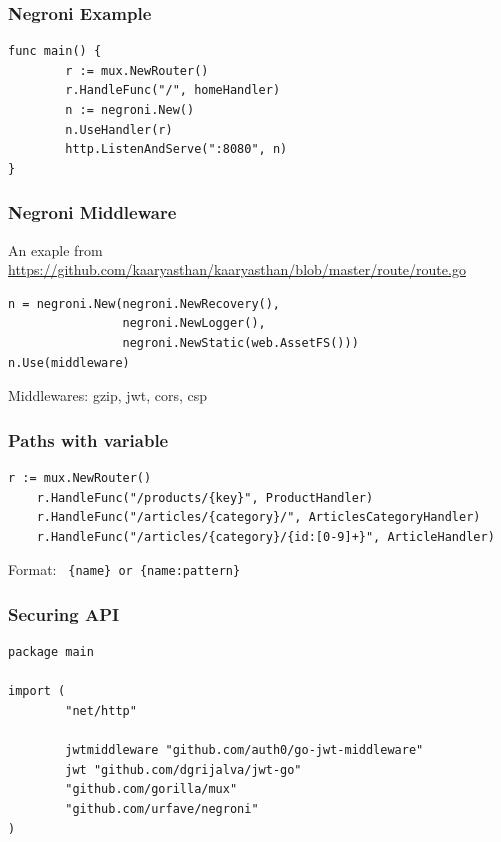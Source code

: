 \documentclass[aspectratio=169]{beamer}
\begin{document}
\begin{frame}[fragile]
  \frametitle{Negroni Example}

\begin{Verbatim}[fontsize=\small]
func main() {
        r := mux.NewRouter()
        r.HandleFunc("/", homeHandler)
        n := negroni.New()
        n.UseHandler(r)
        http.ListenAndServe(":8080", n)
}
\end{Verbatim}
\end{frame}

\begin{frame}[fragile]
  \frametitle{Negroni Middleware}

  An exaple from \small{\url{https://github.com/kaaryasthan/kaaryasthan/blob/master/route/route.go}}
  
\begin{Verbatim}[fontsize=\small]
n = negroni.New(negroni.NewRecovery(),
                negroni.NewLogger(),
                negroni.NewStatic(web.AssetFS()))
n.Use(middleware)
\end{Verbatim}
Middlewares: gzip, jwt, cors, csp
\end{frame}


\begin{frame}[fragile]
  \frametitle{Paths with variable}

  \begin{Verbatim}[fontsize=\small]
    r := mux.NewRouter()
    r.HandleFunc("/products/{key}", ProductHandler)
    r.HandleFunc("/articles/{category}/", ArticlesCategoryHandler)
    r.HandleFunc("/articles/{category}/{id:[0-9]+}", ArticleHandler)
\end{Verbatim}

  Format:
  \texttt{ \{name\} or \{name:pattern\}}

\end{frame}

\begin{frame}[fragile]
  \frametitle{Securing API}

  \begin{Verbatim}[fontsize=\tiny]
package main

import (
        "net/http"

        jwtmiddleware "github.com/auth0/go-jwt-middleware"
        jwt "github.com/dgrijalva/jwt-go"
        "github.com/gorilla/mux"
        "github.com/urfave/negroni"
)
\end{Verbatim}

\end{frame}
\end{document}
